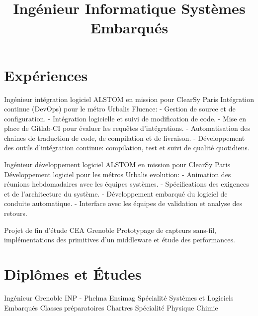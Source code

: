 \documentclass[10pt,a4paper]{moderncv}
\title{\large Ingénieur Informatique Systèmes Embarqués}
\begin{document}
\maketitle

\section{Expériences}

  {Ingénieur intégration logiciel}
  {ALSTOM en mission pour ClearSy}
  {}
  {Paris}
  {Intégration continue (DevOps) pour le métro Urbalis Fluence:\newline{}
  - Gestion de source et de configuration. \newline{}
  - Intégration logicielle et suivi de modification de code. \newline{}
  - Mise en place de Gitlab-CI pour évaluer les requêtes d'intégrations.\newline{} 
  - Automatisation des chaines de traduction de code, de compilation et de livraison.\newline{} 
  - Développement des outils d'intégration continue: compilation, test et suivi de qualité quotidiens.\newline{} }
  
  {Ingénieur développement logiciel}
  {ALSTOM en mission pour ClearSy}
  {}
  {Paris}
  {Développement logiciel pour les métros Urbalis evolution:\newline{}
  - Animation des réunions hebdomadaires avec les équipes systèmes.\newline{}
  - Spécifications des exigences et de l’architecture du système.\newline{}
  - Développement embarqué du logiciel de conduite automatique.\newline{}
  - Interface avec les équipes de validation et analyse des retours.\newline{}}

  {Projet de fin d'étude}
  {CEA}
  {}
  {Grenoble}
  {Prototypage de capteurs sans-fil, implémentations des primitives d'un middleware et étude des performances.\newline{}}

\section{Diplômes et Études}
  {Ingénieur Grenoble INP - Phelma Ensimag}
  {}
  {}
  {}
  {Spécialité Systèmes et Logiciels Embarqués\newline{}}
  {Classes préparatoires}
  {}
  {}
  {Chartres}
  {Spécialité Physique Chimie\newline{}}
\end{document}
